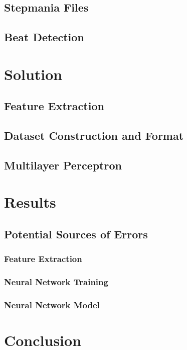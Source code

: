 \documentclass[12pt]{article}
\begin{document}
\subsection{Stepmania Files}



\subsection{Beat Detection}


\section{Solution}


\subsection{Feature Extraction}


\subsection{Dataset Construction and Format}


\subsection{Multilayer Perceptron}

\pagebreak
\section{Results}


\subsection{Potential Sources of Errors}

\subsubsection{Feature Extraction}


\subsubsection{Neural Network Training}

\subsubsection{Neural Network Model}


\pagebreak
\section{Conclusion}


\pagebreak


\end{document}
